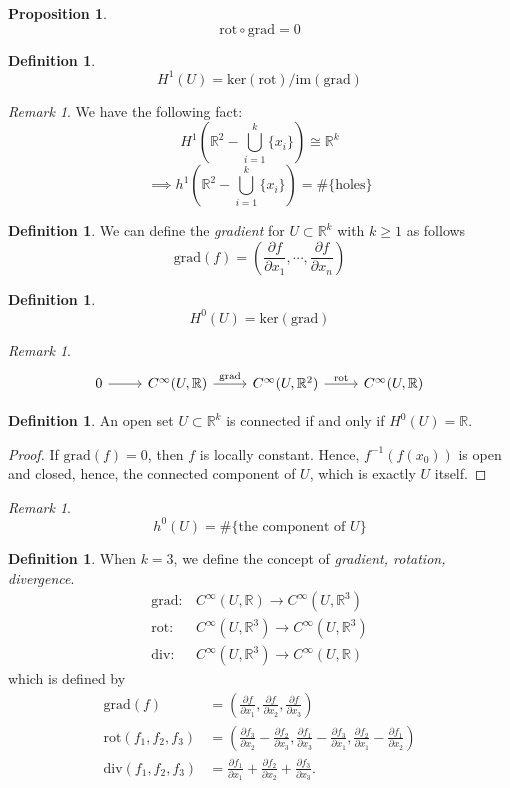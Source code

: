 \documentclass[11pt]{report}
\newtheorem{prop}[thm]{Proposition}
\theoremstyle{definition}
\newtheorem{defn}[thm]{Definition}
\theoremstyle{remark}
\newtheorem{rmk}[thm]{Remark}
\newcommand{\reals}{\mathbb{R}}
\newcommand{\gradient}{\mathrm{grad}}
\newcommand{\rotation}{\mathrm{rot}}
\newcommand{\divergence}{\mathrm{div}}
\newcommand{\kernel}{\mathrm{ker}}
\newcommand{\image}{\mathrm{im}}
\begin{document}
\begin{prop}
  \[\rotation\circ\gradient=0\]
\end{prop}
\begin{defn}
  \[
  H^1(U)=\kernel(\rotation)/\image(\gradient)
  \]
\end{defn}
\begin{rmk}
  We have the following fact:
  \[
  H^1\left(\reals^2-\bigcup_{i=1}^k\{x_i\}\right)\cong \reals^k
  \]
  \[
    \implies h^1\left(\reals^2-\bigcup_{i=1}^k\{x_i\}\right)=\#\{\text{holes}\}
  \] 
\end{rmk}
\begin{defn}
  We can define the \emph{gradient} for $U\subset\reals^k$ with $k\geq 1$ as follows
  \[
  \gradient(f)=\left(\frac{\partial f}{\partial x_1},\cdots,\frac{\partial f}{\partial x_n}\right)
  \]
\end{defn}
\begin{defn}
  \[
  H^0(U)=\kernel\left(\gradient\right)
  \]
\end{defn}
\begin{rmk}
  \[
  \begin{tikzcd}
    0\ar[r]&C^\infty(U,\reals)\ar[r,"\gradient"]&C^\infty(U,\reals^2)\ar[r,"\rotation"]&
    C^\infty(U,\reals)
  \end{tikzcd}
  \]
\end{rmk}
\begin{defn}
  An open set $U\subset \reals^k$ is connected if and only if $H^0(U)=\reals$.
\end{defn}
\begin{proof}
  If $\gradient(f)=0$, then $f$ is locally constant. Hence, $f^{-1}\left(f(x_0)\right)$ is open and closed, hence, the connected component of $U$, which is exactly $U$ itself.
\end{proof}
\begin{rmk}
\[
h^0(U)=\#\{\text{the component of }U \}
\]
\end{rmk}
\begin{defn}
  When $k=3$, we define the concept of \emph{gradient, rotation, divergence}.
  \begin{align*}
    \gradient: &C^\infty(U,\reals)\to C^\infty(U,\reals^3) \\
    \rotation:&C^\infty(U,\reals^3)\to C^\infty(U,\reals^3) \\
    \divergence:&  C^\infty(U,\reals^3)\to C^\infty(U,\reals)
  \end{align*}
  which is defined by
  \begin{align*}
     \gradient(f)&=\left(\frac{\partial f}{\partial x_1},\frac{\partial f}{\partial x_2},\frac{\partial f}{\partial x_3}\right) \\
     \rotation(f_1,f_2,f_3)&=\left(\frac{\partial f_3}{\partial x_2}-\frac{\partial f_2}{\partial x_3},\frac{\partial f_1}{\partial x_3}-\frac{\partial f_3}{\partial x_1},\frac{\partial f_2}{\partial x_1}-\frac{\partial f_1}{\partial x_2}\right)\\
    \divergence(f_1,f_2,f_3)&=\frac{\partial f_1}{\partial x_1}+\frac{\partial f_2}{\partial x_2}+\frac{\partial f_3}{\partial x_3}.
  \end{align*}
\end{defn}
\end{document}
